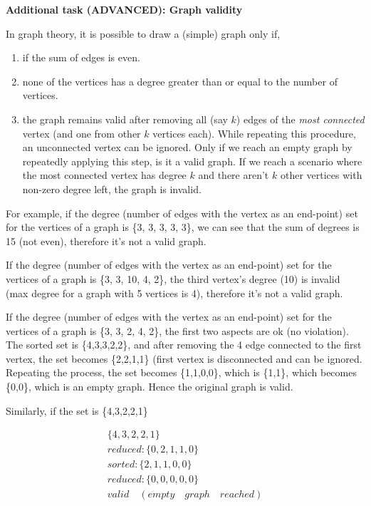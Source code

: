 \begin{questions}
\question \textbf{Additional task (ADVANCED): Graph validity} \vskip 0.5cm

In graph theory, it is possible to draw a (simple) graph only if,

\begin{enumerate}
\item if the sum of edges is even.
\item none of the vertices has a degree greater than or equal to the number of vertices.
\item the graph remains valid after removing all (say $k$) edges of the \emph{most connected} vertex (and one from other $k$ vertices each). While repeating this procedure, an unconnected vertex can be ignored. Only if we reach an empty graph by repeatedly applying this step, is it a valid graph. If we reach a scenario where the most connected vertex has degree $k$ and there aren't $k$ other vertices with non-zero degree left, the graph is invalid.
\end{enumerate}

For example, if the degree (number of edges with the vertex as an end-point) set for the vertices of a graph is \{3, 3, 3, 3, 3\}, we can see that the sum of degrees is 15 (not even), therefore it's not a valid graph.

If the degree (number of edges with the vertex as an end-point) set for the vertices of a graph is \{3, 3, 10, 4, 2\}, the third vertex's degree (10) is invalid (max degree for a graph with 5 vertices is 4), therefore it's not a valid graph.

If the degree (number of edges with the vertex as an end-point) set for the vertices of a graph is \{3, 3, 2, 4, 2\}, the first two aspects are ok (no violation). The sorted set is \{4,3,3,2,2\}, and after removing the 4 edge connected to the first vertex, the set becomes \{2,2,1,1\} (first vertex is disconnected and can be ignored. Repeating the process, the set becomes \{1,1,0,0\}, which is \{1,1\}, which becomes \{0,0\}, which is an empty graph. Hence the original graph is valid.

Similarly, if the set is \{4,3,2,2,1\}

\begin{align*}
\{4,3,2,2,1\}\\
reduced: \{0,2,1,1,0\}\\
sorted: \{2,1,1,0,0\}\\
reduced: \{0,0,0,0,0\}\\
valid \quad (empty \quad graph \quad reached)
\end{align*}


\end{questions}
